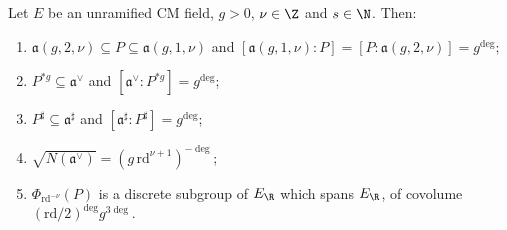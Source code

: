 \begin{theorem}\label{pf:thmS:latfacts}
Let $E$ be an unramified CM field, $g>0$, $\nu\in\Z$ and $s\in\N$. Then:
\begin{enumerate}
\item $\mathfrak a(g,2,\nu)\subseteq P\subseteq\mathfrak a(g,1,\nu)$ and $[\mathfrak a(g,1,\nu):P]=[P:\mathfrak a(g,2,\nu)]=g^{\deg}$;
\item $P^{*g}\subseteq\mathfrak a^\vee$ and $[\mathfrak a^\vee:P^{*g}]=g^{\deg}$;
\item $P^\sharp\subseteq\mathfrak a^\sharp$ and $[\mathfrak a^\sharp:P^\sharp]=g^{\deg}$;
\item $\sqrt{N(\mathfrak a^\vee)}=(g\,\mathrm{rd}^{\nu+1})^{-\deg}$;
\item $\Phi_{\mathrm{rd}^{-\nu}}(P)$ is a discrete subgroup of $E_\R$ which spans $E_\R$, of covolume $(\mathrm{rd}/2)^{\deg}g^{3\deg}$.
\end{enumerate}
\end{theorem}

